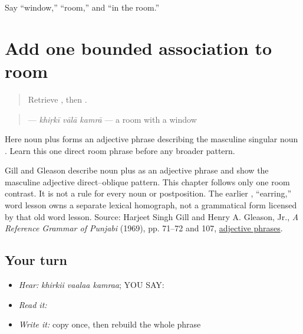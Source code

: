 \begin{tcolorbox}[breakable,colback=teal!4,colframe=teal!35!black,title={Before you move on}]
Say “window,” “room,” and “in the room.”
\end{tcolorbox}
\section[\texorpdfstring{\pa{ਖਿੜਕੀ} \pa{ਵਾਲਾ} \pa{ਕਮਰਾ} (khirkii vaalaa kamraa)}{ਖਿੜਕੀ ਵਾਲਾ ਕਮਰਾ (khirkii vaalaa kamraa)}]{Add one bounded association to room}

\label{lesson:PA-C195-vala}



\begin{quote}
Retrieve \textbf{}, then \textbf{}.
\end{quote}

\begin{grammarlens}[title={Grammar Lens: direct owner}]
\begin{quote}
\textbf{  } — \emph{khiṛkī vālā kamrā} — a room with a window
\end{quote}

Here noun \textbf{} plus \textbf{} forms an adjective phrase describing the masculine singular noun \textbf{}. Learn this one direct room phrase before any broader pattern.
\end{grammarlens}

\begin{grammarlens}[title={Grammar Lens: source and scope boundary}]
Gill and Gleason describe noun plus \textbf{} as an adjective phrase and show the masculine adjective direct–oblique pattern. This chapter follows only one room contrast. It is not a rule for every noun or postposition. The earlier \textbf{}, “earring,” word lesson owns a separate lexical homograph, not a grammatical form licensed by that old word lesson. Source: Harjeet Singh Gill and Henry A. Gleason, Jr., \emph{A Reference Grammar of Punjabi} (1969), pp. 71–72 and 107, \href{https://pt.learnpunjabi.org/assets/A\%20Reference\%20Grammar\_Final.pdf}{adjective phrases}.
\end{grammarlens}

\subsection*{Your turn}
\begin{itemize}
\raggedright
  \item \emph{Hear:} \emph{khirkii vaalaa kamraa}; YOU SAY: \textbf{  }
  \item \emph{Read it:} \textbf{  }
  \item \emph{Write it:} copy \textbf{} once, then rebuild the whole phrase
\end{itemize}

